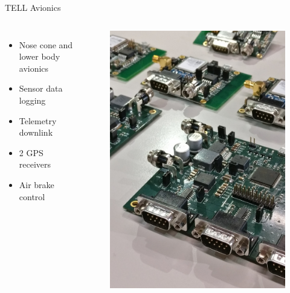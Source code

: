 \documentclass[12pt, compress, xcolor=table]{beamer}
\begin{document}
\begin{frame}{TELL Avionics}
 \begin{columns}
  
  \begin{itemize}
   \setlength\itemsep{0.5cm}
   \item Nose cone and lower body avionics
   \item Sensor data logging
   \item Telemetry downlink
   \item 2 GPS receivers
   \item Air brake control
  \end{itemize}
  
  \begin{figure}
   \centering
   \includegraphics[width=\textwidth]{images/Avionics.png}
  \end{figure}
  
 \end{columns}
\end{frame}
\end{document}
